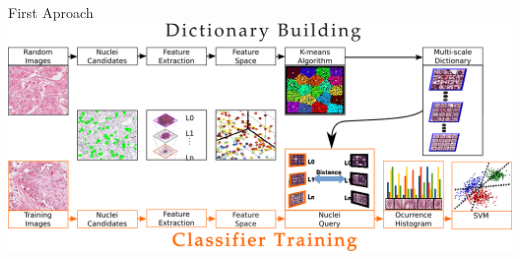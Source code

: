 \documentclass[usenames,dvipsnames]{beamer}
\let\oldfootnote\footnote
\renewcommand\footnote[1][]{\footnotesize\oldfootnote[frame,#1]}
\renewcommand{\footnotesize}{\tiny}
\begin{document}
%
%
%




\begin{frame}{First Aproach}
\includegraphics[width=\textwidth]{imagenes/metodo_BoF.png}
\end{frame}
\end{document}
